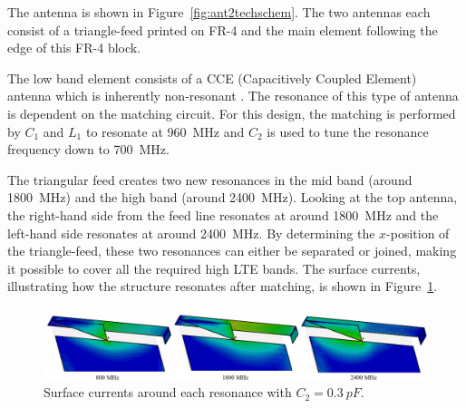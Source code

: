 The antenna is shown in Figure~\ref{fig:ant2techschem}. The two antennas each consist of a triangle-feed printed on FR-4 and the main element following the edge of this FR-4 block.

The low band element consists of a CCE (Capacitively Coupled Element) antenna which is inherently non-resonant \cite{valkonen2013inherently,ilvonen2014design}. The resonance of this type of antenna is dependent on the matching circuit. For this design, the matching is performed by $C_1$ and $L_1$ to resonate at \SI{960}{MHz} and $C_2$ is used to tune the resonance frequency down to \SI{700}{MHz}.

The triangular feed creates two new resonances in the mid band (around \SI{1800}{MHz}) and the high band (around \SI{2400}{MHz}). Looking at the top antenna, the right-hand side from the feed line resonates at around \SI{1800}{MHz} and the left-hand side resonates at around \SI{2400}{MHz}. By determining the $x$-position of the triangle-feed, these two resonances can either be separated or joined, making it possible to cover all the required high LTE bands. The surface currents, illustrating how the structure resonates after matching, is shown in Figure~\ref{fig:ant2surfaces}.

\begin{figure}[htbp]
    \centering
    \includegraphics{img/tech_sol/trianglefeed/surface_currents}
    \caption{Surface currents around each resonance with $C_2=\SI{0.3}{pF}$.}
    \label{fig:ant2surfaces}
\end{figure}

